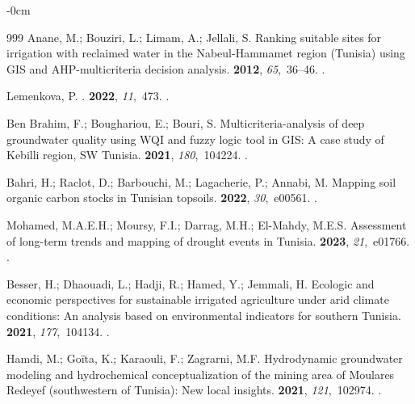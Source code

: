 \documentclass[land,article,accept,pdftex,moreauthors]{Definitions/mdpi}
\begin{document}
\begin{adjustwidth}{-\extralength}{0cm}
\begin{thebibliography}{999}
Anane, M.; Bouziri, L.; Limam, A.; Jellali, S.
\newblock Ranking suitable sites for irrigation with reclaimed water in the
  Nabeul-Hammamet region (Tunisia) using GIS and AHP-multicriteria decision
  analysis.
 {\bf 2012}, {\em
  65},~36--46.
.

Lemenkova, P.
.
 {\bf 2022}, {\em
  11},~473.
.

{Ben Brahim}, F.; Boughariou, E.; Bouri, S.
\newblock Multicriteria-analysis of deep groundwater quality using WQI and
  fuzzy logic tool in GIS: A case study of Kebilli region, SW Tunisia.
 {\bf 2021}, {\em
  180},~104224.
.

Bahri, H.; Raclot, D.; Barbouchi, M.; Lagacherie, P.; Annabi, M.
\newblock Mapping soil organic carbon stocks in Tunisian topsoils.
 {\bf 2022}, {\em 30},~e00561.
.

Mohamed, M.A.E.H.; Moursy, F.I.; Darrag, M.H.; El-Mahdy, M.E.S.
\newblock Assessment of long-term trends and mapping of drought events in
  Tunisia.
 {\bf 2023}, {\em 21},~e01766.
.

Besser, H.; Dhaouadi, L.; Hadji, R.; Hamed, Y.; Jemmali, H.
\newblock Ecologic and economic perspectives for sustainable irrigated
  agriculture under arid climate conditions: An analysis based on environmental
  indicators for southern Tunisia.
 {\bf 2021}, {\em
  177},~104134.
.

Hamdi, M.; Goïta, K.; Karaouli, F.; Zagrarni, M.F.
\newblock Hydrodynamic groundwater modeling and hydrochemical conceptualization
  of the mining area of Moulares Redeyef (southwestern of Tunisia): New local
  insights.
 {\bf 2021},
  {\em 121},~102974.
.


\end{thebibliography}
\end{adjustwidth}
\end{document}
